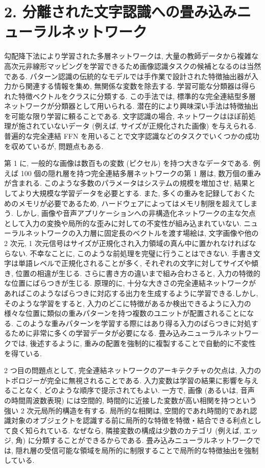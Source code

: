 \documentclass[twocolumn]{jarticle}     %
\begin{document}
\section{2. 分離された文字認識への畳み込みニューラルネットワーク}
勾配降下法により学習された多層ネットワークは, 大量の教師データから複雑な高次元非線形マッピングを学習できるため画像認識タスクの候補となるのは当然である.
パターン認識の伝統的なモデルでは手作業で設計された特徴抽出器が入力から関連する情報を集め, 無関係な変数を除去する. 学習可能な分類器は得られた特徴ベクトルをクラスに分類する. この手法では, 標準的な完全連結型多層ネットワークが分類器として用いられる. 潜在的により興味深い手法は特徴抽出を可能な限り学習に頼ることである. 文字認識の場合, ネットワークはほぼ前処理が施されていないデータ (例えば, サイズが正規化された画像) を与えられる. 普遍的な完全連結 FFN を用いることで文字認識などのタスクでいくつかの成功を収めているが, 問題点もある.
\par
第 1 に, 一般的な画像は数百もの変数 (ピクセル) を持つ大きなデータである. 例えば 100 個の隠れ層を持つ完全連結多層ネットワークの第 1 層は, 数万個の重みが含まれる. このような多数のパラメータはシステムの規模を増加させ, 結果としてより大規模な学習データを必要とする. また, 多くの重みを記録しておくためのメモリが必要であるため, ハードウェアによってはメモリ制限を超えてしまう. しかし, 画像や音声アプリケーションへの非構造化ネットワークの主な欠点として入力の変換や局所的な歪みに対しての不変性が組み込まれていない.
ニューラルネットワークの入力層に固定長のベクトルを渡す場絵は, 文字画像や他の 2 次元, 1 次元信号はサイズが正規化され入力領域の真ん中に置かれなければならない.
不幸なことに, このような前処理を完璧に行うことはできない. 手書き文字は単語レベルで正規化されることが多く, それぞれの文字に対してサイズや傾き, 位置の相違が生じる. さらに書き方の違いまで組み合わさると, 入力の特徴的な位置にばらつきが生じる. 
原理的に, 十分な大きさの完全連結ネットワークがあればこのようなばらつきに対応する出力を生成するように学習できる.しかし, そのような学習をすると, 入力のどこに特徴があるか検出できるように入力の様々な位置に類似の重みパターンを持つ複数のユニットが配置されることになる. このような重みパターンを学習する際にはあり得る入力のばらつきに対処するために非常に多くの学習データが必要になる. 畳み込みニューラルネットワークでは, 後述するように, 重みの配置を強制的に複製することで自動的に不変性を得ている.
\par
2 つ目の問題点として, 完全連結ネットワークのアーキテクチャの欠点は, 入力のトポロジーが完全に無視されることである. 入力変数は学習の結果に影響を与えることなく, どのような順序で提示されてもよい. 一方で, 画像 (あるいは, 音声の時間周波数表現) には空間的, 時間的に近接した変数が高い相関を持つという強い 2 次元局所的構造を有する. 局所的な相関は, 空間的であれ時間的であれ認識対象のオブジェクトを認識する前に局所的な特徴を特徴・結合できる利点として良く知られている.
なぜなら, 隣接変数の構成は少数のカテゴリ (例えば, エッジ, 角) に分類することができるからである. 畳み込みニューラルネットワークでは, 隠れ層の受信可能な領域を局所的に制限することで局所的な特徴抽出を強制している.
\end{document}
